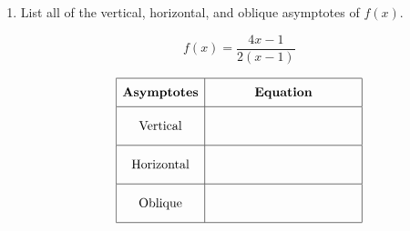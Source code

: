 \documentclass[11pt]{article}
\begin{document}
\begin{enumerate}
{\begin{enumerate}
{{range: \(\boxed{ y \neq 3 }\)

}
}

\item
{}

\end{enumerate}
}

\newpage

% 

\item %
\providecommand{\stxKnowl}{}\renewcommand{\stxKnowl}[1]{#1}
\providecommand{\stxOuttro}{}\renewcommand{\stxOuttro}[1]{#1}
\providecommand{\stxTitle}{}\renewcommand{\stxTitle}[1]{#1}
\renewcommand{\stxOuttro}[1]{}
\stxKnowl{
List all of the vertical, horizontal, and oblique asymptotes of \(f(x)\).

\[f(x) = \frac{4x - 1}{2(x - 1)}\]

 \[\begin{array}{|c|c|} \hline \rule[-0.8em]{0pt}{2.2em} \textbf{Asymptotes} & \textbf{Equation} \\ \hline \rule[-1.2em]{0pt}{3em} \text{Vertical} & \text{\hspace{4cm}} \\ \hline \rule[-1.2em]{0pt}{3em} \text{Horizontal} & \text{\hspace{4cm}} \\ \hline \rule[-1.2em]{0pt}{3em} \text{Oblique} & \text{\hspace{4cm}} \\ \hline \end{array}\] 

\stxOuttro{
Solution

 \[\begin{array}{|c|c|} \hline \rule[-0.8em]{0pt}{2.2em} \textbf{Asymptotes} & \textbf{Equation} \\ \hline \rule[-1.2em]{0pt}{3em} \text{Vertical} & x = 1 \\ \hline \rule[-1.2em]{0pt}{3em} \text{Horizontal} & y = 4 \\ \hline \rule[-1.2em]{0pt}{3em} \text{Oblique} & \text{none} \\ \hline \end{array}\] 

}}
\end{enumerate}
\end{document}
